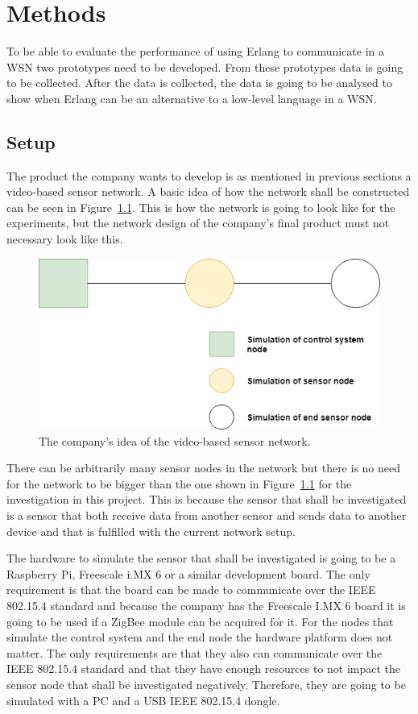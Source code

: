 \chapter{Methods}
To be able to evaluate the performance of using Erlang to communicate in a WSN two prototypes need to be developed. From these prototypes data is going to be collected. After the data is collected, the data is going to be analysed to show when Erlang can be an alternative to a low-level language in a WSN. 

\section{Setup}
The product the company wants to develop is as mentioned in previous sections a video-based sensor network. A basic idea of how the network shall be constructed can be seen in Figure~\ref{fig:setup}. This is how the network is going to look like for the experiments, but the network design of the company’s final product must not necessary look like this. 

\begin{figure}[H]
\centering
\includegraphics[scale=0.6]{figure/setup.png}
\caption{The company’s idea of the video-based sensor network.}
\label{fig:setup}
\end{figure}

There can be arbitrarily many sensor nodes in the network but there is no need for the network to be bigger than the one shown in Figure~\ref{fig:setup} for the investigation in this project. This is because the sensor that shall be investigated is a sensor that both receive data from another sensor and sends data to another device and that is fulfilled with the current network setup. 

The hardware to simulate the sensor that shall be investigated is going to be a Raspberry Pi, Freescale i.MX 6 or a similar development board. The only requirement is that the board can be made to communicate over the IEEE 802.15.4 standard and because the company has the Freescale I.MX 6 board it is going to be used if a ZigBee module can be acquired for it. For the nodes that simulate the control system and the end node the hardware platform does not matter. The only requirements are that they also can communicate over the IEEE 802.15.4 standard and that they have enough resources to not impact the sensor node that shall be investigated negatively. Therefore, they are going to be simulated with a PC and a USB IEEE 802.15.4 dongle.

